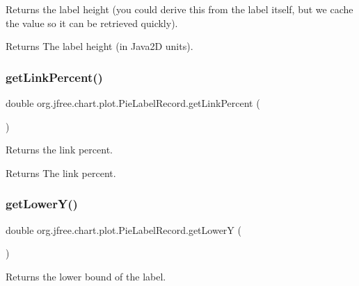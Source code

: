 Returns the label height (you could derive this from the label itself, but we cache the value so it can be retrieved quickly).

\begin{DoxyReturn}{Returns}
The label height (in Java2D units). 
\end{DoxyReturn}
\mbox{\label{classorg_1_1jfree_1_1chart_1_1plot_1_1_pie_label_record_acb7040ad84c8d197ef5b64ddfe4c0187}} 
\subsubsection{\texorpdfstring{get\+Link\+Percent()}{getLinkPercent()}}
{\footnotesize\ttfamily double org.\+jfree.\+chart.\+plot.\+Pie\+Label\+Record.\+get\+Link\+Percent (\begin{DoxyParamCaption}{ }\end{DoxyParamCaption})}

Returns the link percent.

\begin{DoxyReturn}{Returns}
The link percent. 
\end{DoxyReturn}
\mbox{\label{classorg_1_1jfree_1_1chart_1_1plot_1_1_pie_label_record_a488268ee71a373424f99c2322128692e}} 
\subsubsection{\texorpdfstring{get\+Lower\+Y()}{getLowerY()}}
{\footnotesize\ttfamily double org.\+jfree.\+chart.\+plot.\+Pie\+Label\+Record.\+get\+LowerY (\begin{DoxyParamCaption}{ }\end{DoxyParamCaption})}

Returns the lower bound of the label.

